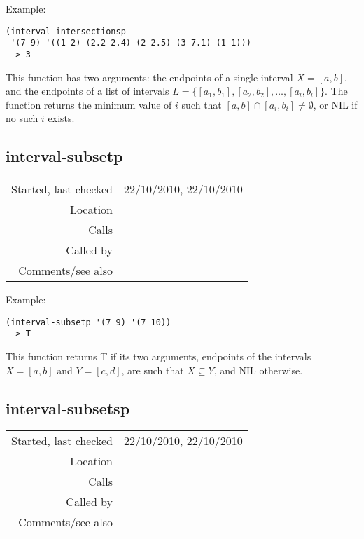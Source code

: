 \vspace{0.5cm}
\noindent Example:
\begin{verbatim}
(interval-intersectionsp
 '(7 9) '((1 2) (2.2 2.4) (2 2.5) (3 7.1) (1 1)))
--> 3
\end{verbatim}

\noindent This function has two arguments: the
endpoints of a single interval $X = [a, b]$, and the
endpoints of a list of intervals $L = \{[a_1, b_1],
[a_2, b_2],\ldots, [a_l, b_l]\}$. The function returns
the minimum value of $i$ such that $[a, b] \cap
[a_i, b_i] \neq \emptyset$, or NIL if no such $i$
exists.


\subsection*{interval-subsetp}\label{fun:interval-subsetp}

\vspace{0.3cm}
\begin{tabular}{r|p{8cm}}
Started, last checked & 22/10/2010, 22/10/2010 \\
Location & \nameref{sec:generating-with-patterns-preliminaries} \\
Calls & \\
Called by & \nameref{fun:interval-subsetsp} \\
Comments/see also &
\end{tabular}

\vspace{0.5cm}
\noindent Example:
\begin{verbatim}
(interval-subsetp '(7 9) '(7 10))
--> T
\end{verbatim}

\noindent This function returns T if its two
arguments, endpoints of the intervals $X = [a, b]$
and $Y = [c, d]$, are such that $X \subseteq Y$, and
NIL otherwise.


\subsection*{interval-subsetsp}\label{fun:interval-subsetsp}

\vspace{0.3cm}
\begin{tabular}{r|p{8cm}}
Started, last checked & 22/10/2010, 22/10/2010 \\
Location & \nameref{sec:generating-with-patterns-preliminaries} \\
Calls & \nameref{fun:interval-subsetp} \\
Called by & \nameref{fun:generate-intervals} \\
Comments/see also &
\end{tabular}

